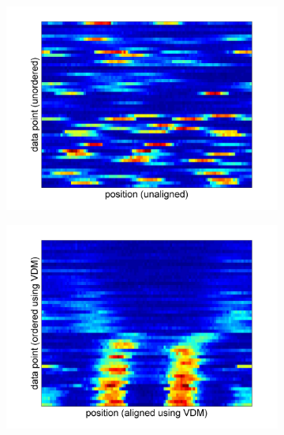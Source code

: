 \documentclass[10pt]{article}
\begin{document}
\begin{figure}[!ht]
\begin{subfigure}{0.3\textwidth}
\includegraphics[width=\textwidth]{data_unaligned_unordered}
\caption{}
\end{subfigure}
\begin{subfigure}{0.3\textwidth}
\includegraphics[width=\textwidth]{data_ordered_vdm}
\caption{}
\end{subfigure}
\begin{subfigure}{0.3\textwidth}

\end{subfigure}
\end{figure}
\end{document}
